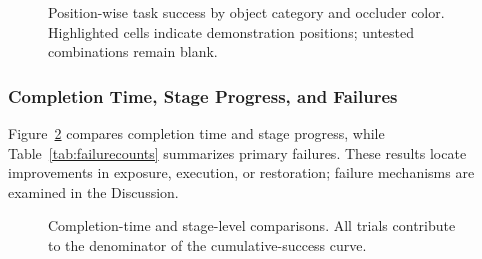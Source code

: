 \begin{figure}[!t]
\centering
\caption{Position-wise task success by object category and occluder color. Highlighted cells indicate demonstration positions; untested combinations remain blank.}
\label{fig:positionperformance}
\end{figure}

\subsubsection{Completion Time, Stage Progress, and Failures}
Figure~\ref{fig:timeandstages} compares completion time and stage progress, while Table~\ref{tab:failurecounts} summarizes primary failures.
These results locate improvements in exposure, execution, or restoration; failure mechanisms are examined in the Discussion.
\begin{figure}[!t]
\centering
\caption{Completion-time and stage-level comparisons. All trials contribute to the denominator of the cumulative-success curve.}
\label{fig:timeandstages}
\end{figure}

